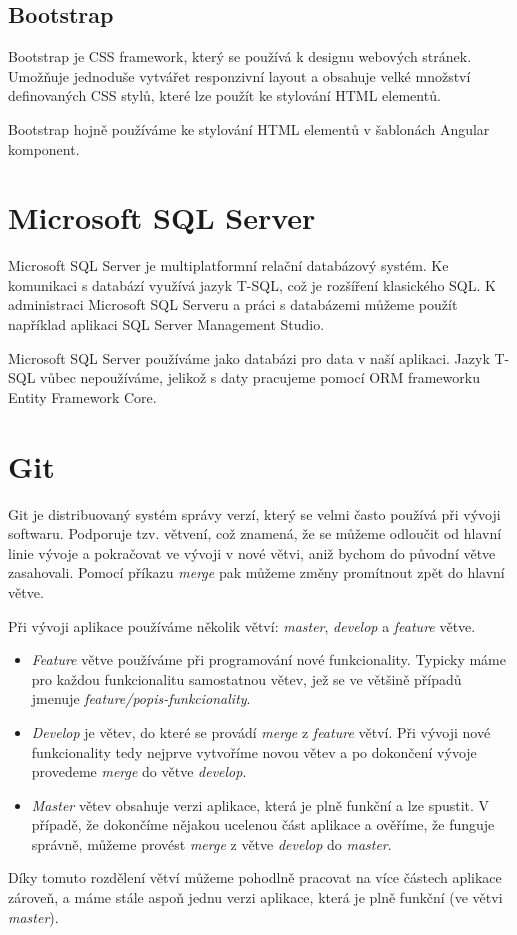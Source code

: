 \subsection{Bootstrap}
Bootstrap je CSS framework, který se používá k designu webových stránek.
Umožňuje jednoduše vytvářet responzivní layout a obsahuje velké množství definovaných CSS stylů, které lze použít ke stylování HTML elementů.
\cite{BootstrapDocs}

Bootstrap hojně používáme ke stylování HTML elementů v šablonách Angular komponent.

\section{Microsoft SQL Server}
Microsoft SQL Server je multiplatformní relační databázový systém. Ke komunikaci s databází využívá jazyk T-SQL, což je rozšíření klasického SQL. K administraci Microsoft SQL Serveru a práci s databázemi můžeme použít například aplikaci SQL Server Management Studio.
\cite{SqlServerDocs}

Microsoft SQL Server používáme jako databázi pro data v naší aplikaci. Jazyk T-SQL vůbec nepoužíváme, jelikož s daty pracujeme pomocí ORM frameworku Entity Framework Core.

\section{Git}
Git je distribuovaný systém správy verzí, který se velmi často používá při vývoji softwaru. Podporuje tzv. větvení, což znamená, že se můžeme odloučit od hlavní linie vývoje a pokračovat ve vývoji v nové větvi, aniž bychom do původní větve zasahovali. Pomocí příkazu \textit{merge} pak můžeme změny promítnout zpět do hlavní větve.
\cite{GitDocs}

Při vývoji aplikace používáme několik větví: \textit{master}, \textit{develop} a \textit{feature} větve.
\begin{itemize}
	\item \textit{Feature} větve používáme při programování nové funkcionality. Typicky máme pro každou funkcionalitu samostatnou větev, jež se ve většině případů jmenuje \textit{feature/popis-funkcionality}.
	\item \textit{Develop} je větev, do které se provádí \textit{merge} z \textit{feature} větví. Při vývoji nové funkcionality tedy nejprve vytvoříme novou větev a po dokončení vývoje provedeme \textit{merge} do větve \textit{develop}.
	\item \textit{Master} větev obsahuje verzi aplikace, která je plně funkční a lze spustit. V případě, že dokončíme nějakou ucelenou část aplikace a ověříme, že funguje správně, můžeme provést \textit{merge} z větve \textit{develop} do \textit{master}.
\end{itemize}
Díky tomuto rozdělení větví můžeme pohodlně pracovat na více částech aplikace zároveň, a máme stále aspoň jednu verzi aplikace, která je plně funkční (ve větvi \textit{master}).


